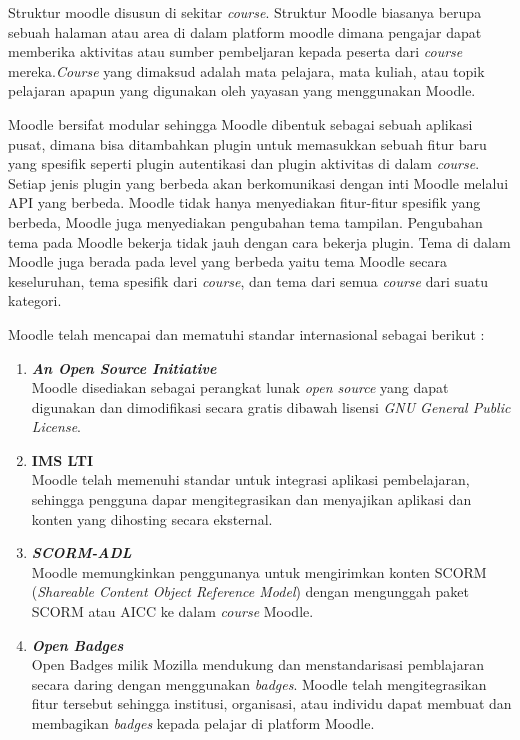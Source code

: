 Struktur moodle disusun di sekitar \textit{course}. Struktur Moodle biasanya berupa sebuah halaman atau area di dalam platform moodle dimana pengajar dapat memberika aktivitas atau sumber pembeljaran kepada peserta dari \textit{course} mereka.\textit{Course} yang dimaksud adalah mata pelajara, mata kuliah, atau topik pelajaran apapun yang digunakan oleh yayasan yang menggunakan Moodle. 

Moodle bersifat modular sehingga Moodle dibentuk sebagai sebuah aplikasi pusat, dimana bisa ditambahkan plugin untuk memasukkan sebuah fitur baru yang spesifik seperti plugin autentikasi dan plugin aktivitas di dalam \textit{course}. Setiap jenis plugin yang berbeda akan berkomunikasi dengan inti Moodle melalui API yang berbeda. Moodle tidak hanya menyediakan fitur-fitur spesifik yang berbeda, Moodle juga menyediakan pengubahan tema tampilan. Pengubahan tema pada Moodle bekerja tidak jauh dengan cara bekerja plugin. Tema di dalam Moodle juga berada pada level yang berbeda yaitu tema Moodle secara keseluruhan, tema spesifik dari \textit{course}, dan tema dari semua \textit{course} dari suatu kategori. \cite{moodle:dev}

Moodle telah mencapai dan mematuhi standar internasional sebagai berikut : \cite{moodle:39}
		\begin{enumerate}
			\item \textbf{\textit{An Open Source Initiative}} \\
				Moodle disediakan sebagai perangkat lunak \textit{open source} yang dapat digunakan dan dimodifikasi secara gratis dibawah lisensi \textit{\textit{GNU General Public License}}.
			\item \textbf{IMS LTI\texttrademark} \\
				Moodle telah memenuhi standar untuk integrasi aplikasi pembelajaran, sehingga pengguna dapar mengitegrasikan dan menyajikan aplikasi dan konten yang dihosting secara eksternal.
			\item \textbf{\textit{SCORM-ADL}} \\
				Moodle memungkinkan penggunanya untuk mengirimkan konten SCORM (\textit{Shareable Content Object Reference Model}) dengan mengunggah paket SCORM atau AICC ke dalam \textit{course} Moodle.
	
			\item \textbf{\textit{Open Badges}} \\
				Open Badges milik Mozilla mendukung dan menstandarisasi pemblajaran secara daring dengan menggunakan \textit{badges}. Moodle telah mengitegrasikan fitur tersebut sehingga institusi, organisasi, atau individu dapat membuat dan membagikan \textit{badges} kepada pelajar di platform Moodle.
		\end{enumerate}

